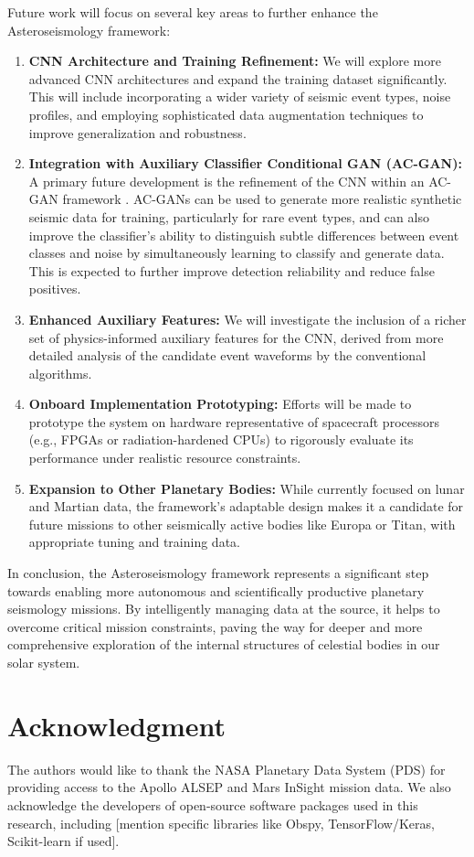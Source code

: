 \documentclass[conference]{IEEEtran}
\begin{document}
Future work will focus on several key areas to further enhance the Asteroseismology framework:
\begin{enumerate}
    \item \textbf{CNN Architecture and Training Refinement:} We will explore more advanced CNN architectures and expand the training dataset significantly. This will include incorporating a wider variety of seismic event types, noise profiles, and employing sophisticated data augmentation techniques to improve generalization and robustness.
    \item \textbf{Integration with Auxiliary Classifier Conditional GAN (AC-GAN):} A primary future development is the refinement of the CNN within an AC-GAN framework \cite{b22}. AC-GANs can be used to generate more realistic synthetic seismic data for training, particularly for rare event types, and can also improve the classifier's ability to distinguish subtle differences between event classes and noise by simultaneously learning to classify and generate data. This is expected to further improve detection reliability and reduce false positives.
    \item \textbf{Enhanced Auxiliary Features:} We will investigate the inclusion of a richer set of physics-informed auxiliary features for the CNN, derived from more detailed analysis of the candidate event waveforms by the conventional algorithms.
    \item \textbf{Onboard Implementation Prototyping:} Efforts will be made to prototype the system on hardware representative of spacecraft processors (e.g., FPGAs or radiation-hardened CPUs) to rigorously evaluate its performance under realistic resource constraints.
    \item \textbf{Expansion to Other Planetary Bodies:} While currently focused on lunar and Martian data, the framework's adaptable design makes it a candidate for future missions to other seismically active bodies like Europa or Titan, with appropriate tuning and training data.
\end{enumerate}

In conclusion, the Asteroseismology framework represents a significant step towards enabling more autonomous and scientifically productive planetary seismology missions. By intelligently managing data at the source, it helps to overcome critical mission constraints, paving the way for deeper and more comprehensive exploration of the internal structures of celestial bodies in our solar system.

\section*{Acknowledgment}
The authors would like to thank the NASA Planetary Data System (PDS) for providing access to the Apollo ALSEP and Mars InSight mission data. We also acknowledge the developers of open-source software packages used in this research, including [mention specific libraries like Obspy, TensorFlow/Keras, Scikit-learn if used].
\end{document}
